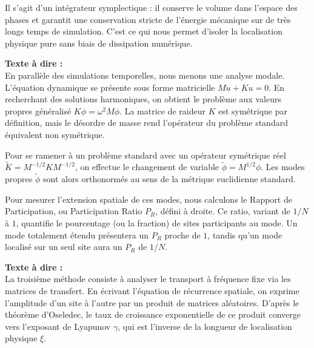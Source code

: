 \documentclass[11pt,a4paper]{article}
\begin{document}
\begin{tcolorbox}[colback=blue!5,colframe=blue!75!black,title=Slide 2 : Table des Matières --- 0:45 à 1:15]
\begin{tcolorbox}[colback=blue!5,colframe=blue!75!black,title=Slide 5 : Réseau 1D Masse-Ressort \& Schéma Symplectique --- 3:15 à 4:15]
Il s'agit d'un intégrateur symplectique : il conserve le volume dans l'espace des phases et garantit une conservation stricte de l'énergie mécanique sur de très longs temps de simulation. C'est ce qui nous permet d'isoler la localisation physique pure sans biais de dissipation numérique. \fg{}
\end{tcolorbox}

\begin{tcolorbox}[colback=blue!5,colframe=blue!75!black,title=Slide 6 : Analyse Modale : Équation Matricielle et Valeurs Propres --- 4:15 à 5:15]
\textbf{Texte à dire :} \\
\og En parallèle des simulations temporelles, nous menons une analyse modale. L'équation dynamique se présente sous forme matricielle $M \ddot{u} + K u = 0$. En recherchant des solutions harmoniques, on obtient le problème aux valeurs propres généralisé $K \phi = \omega^2 M \phi$. La matrice de raideur $K$ est symétrique par définition, mais le désordre de masse rend l'opérateur du problème standard équivalent non symétrique.

Pour se ramener à un problème standard avec un opérateur symétrique réel $\tilde{K} = M^{-1/2} K M^{-1/2}$, on effectue le changement de variable $\tilde{\phi} = M^{1/2} \phi$. Les modes propres $\tilde{\phi}$ sont alors orthonormés au sens de la métrique euclidienne standard.

Pour mesurer l'extension spatiale de ces modes, nous calculons le Rapport de Participation, ou Participation Ratio $P_R$, défini à droite. Ce ratio, variant de $1/N$ à $1$, quantifie le pourcentage (ou la fraction) de sites participants au mode. Un mode totalement étendu présentera un $P_R$ proche de $1$, tandis qu'un mode localisé sur un seul site aura un $P_R$ de $1/N$. \fg{}
\end{tcolorbox}

\newpage

\begin{tcolorbox}[colback=blue!5,colframe=blue!75!black,title=Slide 7 : Matrices de Transfert \& Carte de Riccati --- 5:15 à 6:30]
\textbf{Texte à dire :} \\
\og  La troisième méthode consiste à analyser le transport à fréquence fixe via les matrices de transfert. En écrivant l'équation de récurrence spatiale, on exprime l'amplitude d'un site à l'autre par un produit de matrices aléatoires. D'après le théorème d'Oseledec, le taux de croissance exponentielle de ce produit converge vers l'exposant de Lyapunov $\gamma$, qui est l'inverse de la longueur de localisation physique $\xi$.


\end{tcolorbox}
\end{tcolorbox}
\end{document}

